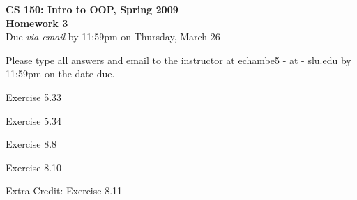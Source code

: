 \documentclass[11pt]{article}
\begin{document}

\begin{center}
\LARGE \textbf{CS 150: Intro to OOP, Spring 2009}
\\
\textbf{Homework 3}
\\[1ex]
\Large Due \emph{via email} by 11:59pm on Thursday, March 26\\

\end{center}

Please type all answers and email to the instructor at echambe5 - at -
slu.edu by 11:59pm on the date due.

\begin{problems}
\item Exercise 5.33

\item Exercise 5.34

\item Exercise 8.8

\item Exercise 8.10

\item Extra Credit: Exercise 8.11

\end{problems}
\end{document}
